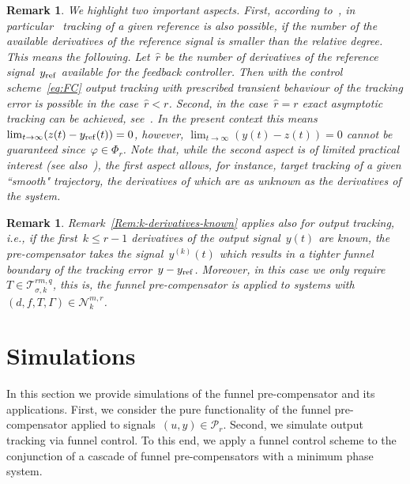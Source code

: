 \documentclass[ envcountsect, envcountsame]{svjour3}
\newtheorem{Remark}[Theorem]{Remark}
\newcommand{\cN}{\mathcal{N}}
\newcommand{\cP}{\mathcal{P}}
\newcommand{\cT}{\mathcal{T}}
\newcommand{\vp}{\varphi}
\begin{document}
\begin{Remark} \label{Rem:aspects-FC}
We highlight two important aspects.
First, according to~\cite[Sec. 1.4]{BergIlch21}, in particular~\cite[Rem. 1.7 (c)]{BergIlch21} tracking of a given reference is also possible, if the number of the available derivatives of the reference signal is smaller than the relative degree. This means the following. Let~$\hat r $ be the number of derivatives of the reference signal~$y_{\rm ref}$ available for the feedback controller. Then with the control scheme~\eqref{eq:FC} output tracking with prescribed transient behaviour of the tracking error is possible in the case~$\hat r < r$.
Second, in the case~$\hat r = r$ exact asymptotic tracking can be achieved, see~\cite[Rem.~1.7 (f)]{BergIlch21}.
In the present context this means $\lim_{t \to \infty} (z(t)-y_{\rm ref}(t)) = 0$, however, $\lim_{t \to \infty} (y(t) - z(t)) = 0$ cannot be guaranteed since~$\vp \in \Phi_r$. 
Note that, while the second aspect is of limited practical interest (see also~\cite[Sec.~1.1]{BergIlch21}), the first aspect allows, for instance, target tracking of a given ``smooth" trajectory, the derivatives of which are as unknown as the derivatives of the system.
\end{Remark}


\begin{Remark}
Remark~\ref{Rem:k-derivatives-known} applies also for output tracking, i.e., if the first~${k \le r-1}$ derivatives of the output signal~$y(t)$ are known, the pre-compensator takes the signal~$y^{(k)}(t)$ which results in a tighter funnel boundary of the tracking error~${y - y_{\rm ref}}$. 
Moreover, in this case we only require~$T \in \cT^{{rm},q}_{\sigma,k}$, this is, the funnel pre-compensator is applied to systems with~$(d,f,T,\Gamma) \in \cN^{m,r}_k$.
\end{Remark}


\section{Simulations} \label{Sec:Simulations}
In this section we provide simulations of the funnel pre-compensator and its applications. 
First, we consider the pure functionality of the funnel pre-compensator applied to signals~$(u,y) \in \cP_r$.
Second, we simulate output tracking via funnel control. %
To this end, we apply a funnel control scheme to the conjunction of a cascade of funnel pre-compensators with a minimum phase system.
\end{document}
